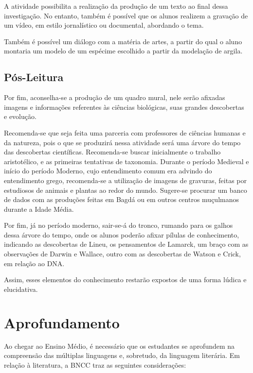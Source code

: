 \documentclass[12pt]{extarticle}
\begin{document}
A atividade possibilita a realização da produção de um texto ao final dessa
investigação. No entanto, também é possível que os alunos realizem a gravação
de um vídeo, em estilo jornalístico ou documental, abordando o tema.

Também é possível um diálogo com a matéria de artes, a partir do qual o aluno
montaria um modelo de um espécime escolhido a partir da modelação de argila.

\subsection{Pós-Leitura}

Por fim, aconselha-se a produção de um quadro mural, nele serão afixadas
imagens e informações referentes às ciências biológicas, suas grandes
descobertas e evolução.

Recomenda-se que seja feita uma parceria com professores de ciências humanas
e da natureza, pois o que se produzirá nessa atividade será uma árvore do tempo
das descobertas científicas. Recomenda-se buscar inicialmente o trabalho
aristotélico, e as primeiras tentativas de taxonomia. Durante o período
Medieval e início do período Moderno, cujo entendimento comum era advindo do
entendimento grego, recomenda-se a utilização de imagens de gravuras, feitas
por estudiosos de animais e plantas ao redor do mundo. Sugere-se procurar um
banco de dados com as produções feitas em Bagdá ou em outros centros muçulmanos
durante a Idade Média.

Por fim, já no período moderno, sair-se-á do tronco, rumando para os galhos
dessa árvore do tempo, onde os alunos poderão afixar pílulas de conhecimento,
indicando as descobertas de Lineu, os pensamentos de Lamarck, um braço com as
observações de Darwin e Wallace, outro com as descobertas de Watson e Crick, em
relação ao DNA.

Assim, esses elementos do conhecimento restarão expostos de uma forma lúdica
e elucidativa.

\section{Aprofundamento}

Ao chegar ao Ensino Médio, é necessário que os estudantes se aprofundem na
compreensão das múltiplas linguagens e, sobretudo, da linguagem literária. Em
relação à literatura, a BNCC traz as seguintes considerações:
\end{document}
